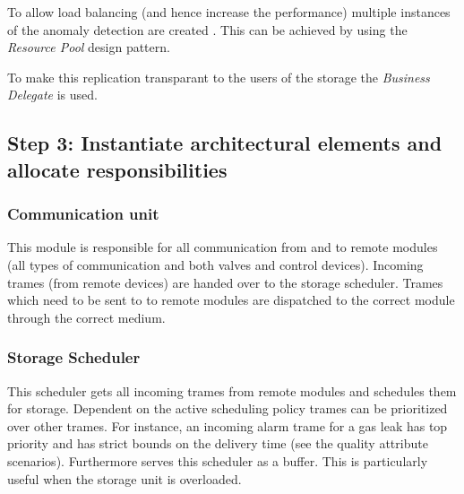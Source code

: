 \npar To allow load balancing (and hence increase the performance) multiple
instances of the anomaly detection are created . This can be achieved by using
the \emph{Resource Pool} design pattern. 

To make this replication transparant to the users of the storage the
\emph{Business Delegate} is used.

\subsection{Step 3: Instantiate architectural elements and allocate responsibilities}
\label{add:it1/elements}


\subsubsection{Communication unit}

\npar This module is responsible for all communication from and to remote
modules (all types of communication and both valves and control devices).
Incoming trames (from remote devices) are handed over to the storage scheduler.
Trames which need to be sent to to remote modules are dispatched to the correct
module through the correct medium.

\subsubsection{Storage Scheduler}

\npar This scheduler gets all incoming trames from remote modules and schedules
them for storage. Dependent on the active scheduling policy trames can be
prioritized over other trames. For instance, an incoming alarm trame for a gas
leak has top priority and has strict bounds on the delivery time (see the
quality attribute scenarios). Furthermore serves this scheduler as a buffer.
This is particularly useful when the storage unit is overloaded.


